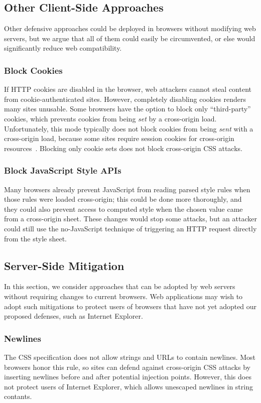 \documentclass{sig-alternate}
\begin{document}
\subsection{Other Client-Side Approaches}
Other defensive approaches could be deployed in browsers without
modifying web servers, but we argue that all of them could easily be
circumvented, or else would significantly reduce web compatibility.

\subsubsection{Block Cookies}
If HTTP cookies are disabled in the browser, web attackers cannot
steal content from cookie-au\-then\-ti\-cated sites.  However, completely
disabling cookies renders many sites unusable.  Some browsers have the
option to block only “third-party” cookies, which prevents cookies
from being \emph{set} by a cross-origin load.  Unfortunately, this
mode typically does not block cookies from being \emph{sent} with a
cross-origin load, because some sites require session cookies for
cross-origin resources~\cite{jackson06thirdpartycookies}.  Blocking
only cookie sets does not block cross-origin CSS attacks.

\subsubsection{Block JavaScript Style APIs}
Many browsers already prevent JavaScript from reading parsed style
rules when those rules were loaded cross-origin; this could be done
more thoroughly, and they could also prevent access to computed style
when the chosen value came from a cross-origin sheet.  These changes
would stop some attacks, but an attacker could still use the
no-JavaScript technique of triggering an HTTP request directly from
the style sheet.

\subsection{Server-Side Mitigation}
In this section, we consider approaches that can be adopted
by web servers without requiring changes to current browsers.
Web applications may wish to adopt such mitigations to
protect users of browsers that have not yet adopted our
proposed defenses, such as Internet Explorer.

\subsubsection{Newlines}
The CSS specification does not allow strings and URLs to contain
newlines.  Most browsers honor this rule, so sites can defend against
cross-origin CSS attacks by inserting newlines before and after
potential injection points.  However, this does not protect users of
Internet Explorer, which allows unescaped newlines in string contants.
\end{document}
